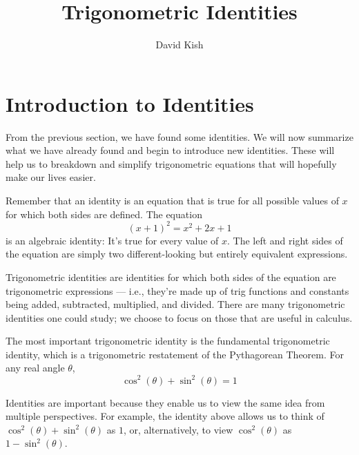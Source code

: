 \documentclass{ximera}
\author{David Kish}
\title{Trigonometric Identities}
\begin{document}
\begin{abstract}
  
\end{abstract}
\maketitle

\section{Introduction to Identities}
From the previous section, we have found some identities.
We will now summarize what we have already found and begin to introduce new identities.
These will help us to breakdown and simplify trigonometric equations that will hopefully make our lives easier.

Remember that an identity is an equation that is true for all possible values of \( x \) for which both sides are defined.
The equation
\[
  (x + 1)^2 = x^2 + 2x + 1
\]
is an algebraic identity: It's true for every value of \( x \).
The left and right sides of the equation are simply two different-looking but entirely equivalent expressions.

Trigonometric identities are identities for which both sides of the equation are trigonometric expressions --- i.e., they're made up of trig functions and constants being added, subtracted, multiplied, and divided.
There are many trigonometric identities one could study; we choose to focus on those that are useful in calculus.

The most important trigonometric identity is the fundamental trigonometric identity, which is a trigonometric restatement of the Pythagorean Theorem. For any real angle \( \theta \),
\begin{equation*}
  \boxed{\cos^2(\theta) + \sin^2(\theta) = 1}
\end{equation*}

Identities are important because they enable us to view the same idea from multiple perspectives.
For example, the identity above allows us to think of \( \cos^2(\theta) + \sin^2(\theta) \) as \( 1 \), or, alternatively, to view \( \cos^2(\theta) \) as \( 1 - \sin^2(\theta) \).
\end{document}
